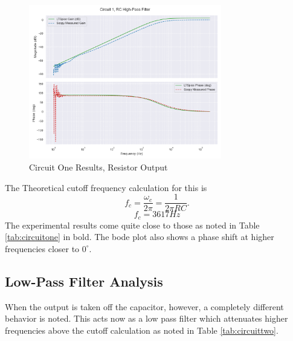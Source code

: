\documentclass[12pt]{article}
\begin{document}
\begin{figure}[H]
	\centering
	\includegraphics[width=0.75\textwidth]{e6_bode1}
	\caption{Circuit One Results, Resistor Output}
\end{figure}

The Theoretical cutoff frequency calculation for this is \[
	f_c = \frac{\omega_c}{2\pi} = \frac{1}{2\pi RC}.
\]
\[
	f_c = 3617Hz
\]
The experimental results come quite close to those as noted in
Table \ref{tab:circuitone} in bold. The bode plot also shows a phase shift at
higher frequencies closer to $0^\circ$.

\subsection{Low-Pass Filter Analysis}
When the output is taken off the capacitor, however, a completely different
behavior is noted. This acts now as a low pass filter which attenuates higher
frequencies above the cutoff calculation as noted in Table \ref{tab:circuittwo}.
\end{document}

